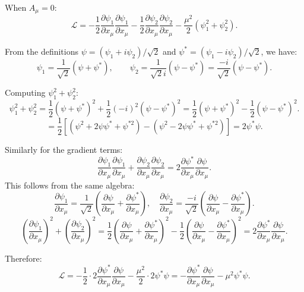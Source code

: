 \documentclass[12pt]{article}
\begin{document}
When $A_\mu = 0$:
\[
  \mathscr{L} = -\frac{1}{2}\frac{\partial\psi_1}{\partial x_\mu}\frac{\partial\psi_1}{\partial x_\mu}
  - \frac{1}{2}\frac{\partial\psi_2}{\partial x_\mu}\frac{\partial\psi_2}{\partial x_\mu}
  - \frac{\mu^2}{2}(\psi_1^2 + \psi_2^2).
\]

From the definitions $\psi = (\psi_1+i\psi_2)/\sqrt{2}$ and $\psi^* = (\psi_1-i\psi_2)/\sqrt{2}$, we have:
\[
  \psi_1 = \frac{1}{\sqrt{2}}(\psi+\psi^*), \qquad \psi_2 = \frac{1}{\sqrt{2}i}(\psi - \psi^*) = \frac{-i}{\sqrt{2}}(\psi-\psi^*).
\]

Computing $\psi_1^2 + \psi_2^2$:
\[
  \psi_1^2 + \psi_2^2 = \frac{1}{2}(\psi+\psi^*)^2 + \frac{1}{2}(-i)^2(\psi-\psi^*)^2
  = \frac{1}{2}(\psi+\psi^*)^2 - \frac{1}{2}(\psi-\psi^*)^2.
\]
\[
  = \frac{1}{2}[(\psi^2+2\psi\psi^*+\psi^{*2}) - (\psi^2-2\psi\psi^*+\psi^{*2})] = 2\psi^*\psi.
\]

Similarly for the gradient terms:
\[
  \frac{\partial\psi_1}{\partial x_\mu}\frac{\partial\psi_1}{\partial x_\mu} + \frac{\partial\psi_2}{\partial x_\mu}\frac{\partial\psi_2}{\partial x_\mu} = 2\frac{\partial\psi^*}{\partial x_\mu}\frac{\partial\psi}{\partial x_\mu}.
\]
This follows from the same algebra:
\[
  \frac{\partial\psi_1}{\partial x_\mu} = \frac{1}{\sqrt{2}}\left(\frac{\partial\psi}{\partial x_\mu}+\frac{\partial\psi^*}{\partial x_\mu}\right), \quad
  \frac{\partial\psi_2}{\partial x_\mu} = \frac{-i}{\sqrt{2}}\left(\frac{\partial\psi}{\partial x_\mu}-\frac{\partial\psi^*}{\partial x_\mu}\right).
\]
\[
  \left(\frac{\partial\psi_1}{\partial x_\mu}\right)^2 + \left(\frac{\partial\psi_2}{\partial x_\mu}\right)^2
  = \frac{1}{2}\left(\frac{\partial\psi}{\partial x_\mu}+\frac{\partial\psi^*}{\partial x_\mu}\right)^2
  - \frac{1}{2}\left(\frac{\partial\psi}{\partial x_\mu}-\frac{\partial\psi^*}{\partial x_\mu}\right)^2
  = 2\frac{\partial\psi^*}{\partial x_\mu}\frac{\partial\psi}{\partial x_\mu}.
\]

Therefore:
\[
  \mathscr{L} = -\frac{1}{2}\cdot 2\frac{\partial\psi^*}{\partial x_\mu}\frac{\partial\psi}{\partial x_\mu} - \frac{\mu^2}{2}\cdot 2\psi^*\psi
  = \boxed{-\frac{\partial\psi^*}{\partial x_\mu}\frac{\partial\psi}{\partial x_\mu} - \mu^2\psi^*\psi.}
\]
\end{document}
